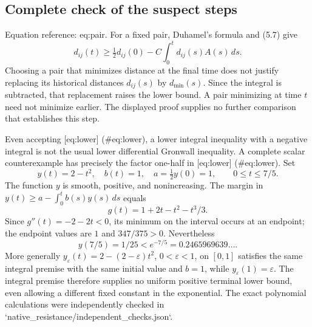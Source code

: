 \documentclass[10pt]{article}
\begin{document}
\subsection*{Complete check of the suspect steps}
Equation reference: eq:pair. For a fixed pair, Duhamel’s formula and (5.7) give \[
 d_{ij}(t)\ge \tfrac12d_{ij}(0)
       -C\int_0^t d_{ij}(s)A(s)\,ds.\] Choosing a pair that minimizes distance at the final time does not justify replacing its historical distances \(d_{ij}(s)\) by \(d_{\min}(s)\). Since the integral is subtracted, that replacement raises the lower bound. A pair minimizing at time \(t\) need not minimize earlier. The displayed proof supplies no further comparison that establishes this step.\par
Even accepting [eq:lower] (\#eq:lower), a lower integral inequality with a negative integral is not the usual lower differential Gronwall inequality. A complete scalar counterexample has precisely the factor one-half in [eq:lower] (\#eq:lower). Set \[y(t)=2-t^2,\quad b(t)=1,\quad a=\tfrac12y(0)=1,
 \qquad 0\le t\le 7/5.\] The function \(y\) is smooth, positive, and nonincreasing. The margin in \(y(t)\ge a-\int_0^t b(s)y(s)\,ds\) equals \[g(t)=1+2t-t^2-t^3/3.\] Since \(g''(t)=-2-2t<0\), its minimum on the interval occurs at an endpoint; the endpoint values are \(1\) and \(347/375>0\). Nevertheless \[y(7/5)=1/25<e^{-7/5}=0.2465969639\ldots .\] More generally \(y_\varepsilon(t)=2-(2-\varepsilon)t^2\), \(0<\varepsilon<1\), on \([0,1]\) satisfies the same integral premise with the same initial value and \(b=1\), while \(y_\varepsilon(1)=\varepsilon\). The integral premise therefore supplies no uniform positive terminal lower bound, even allowing a different fixed constant in the exponential. The exact polynomial calculations were independently checked in `native\_resistance/independent\_checks.json`.\par
\end{document}
